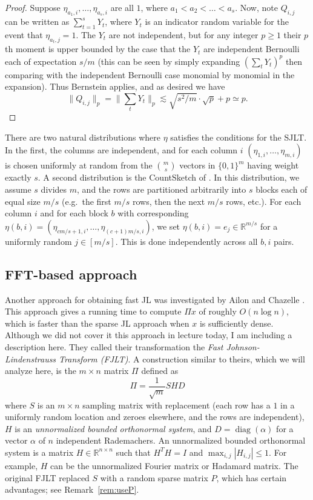 \documentclass[12pt]{article}
\newcommand{\R}{\mathbb{R}}
\newcommand{\EquationName}[1]{\label{eq:#1}}
\newcommand{\Remark}[1]{Remark~\ref{rem:#1}}
\begin{document}
\begin{proof}
Suppose $\eta_{a_1,i}, \ldots, \eta_{a_s, i}$ are all $1$, where $a_1 < a_2 < \ldots < a_s$. Now, note $Q_{i,j}$ can be written as $\sum_{t=1}^s Y_t$, where $Y_t$ is an indicator random variable for the event that $\eta_{a_t, j} = 1$. The $Y_t$ are not independent, but for any integer $p\ge 1$ their $p$th moment is upper bounded by the case that the $Y_t$ are independent Bernoulli each of expectation $s/m$ (this can be seen by simply expanding $(\sum_t Y_t)^p$ then comparing with the independent Bernoulli case monomial by monomial in the expansion). Thus Bernstein applies, and as desired we have
$$
\|Q_{i,j}\|_p = \|\sum_t Y_t\|_p \lesssim \sqrt{s^2/m}\cdot \sqrt{p} + p \simeq p .
$$
\end{proof}

There are two natural distributions where $\eta$ satisfies the conditions for the SJLT. In the first, the columns are independent, and for each column $i$ $(\eta_{1,i},\ldots,\eta_{m,i})$ is chosen uniformly at random from the $\binom{m}{s}$ vectors in $\{0,1\}^m$ having weight exactly $s$. A second distribution is the CountSketch of \cite{CharikarCF04}. In this distribution, we assume $s$ divides $m$, and the rows are partitioned arbitrarily into $s$ blocks each of equal size $m/s$ (e.g.\ the first $m/s$ rows, then the next $m/s$ rows, etc.). For each column $i$ and for each block $b$ with corresponding $\eta(b, i) = (\eta_{cm/s+1, i}, \ldots, \eta_{(c+1)m/s, i})$, we set $\eta(b, i) = e_j\in\R^{m/s}$ for a uniformly random $j\in[m/s]$. This is done independently across all $b, i$ pairs.

\subsection{FFT-based approach}

Another approach for obtaining fast JL was investigated by Ailon and Chazelle \cite{AilonC09}. This approach gives a running time to compute $\Pi x$ of roughly $O(n\log n)$, which is faster than the sparse JL approach when $x$ is sufficiently dense. Although we did not cover it this approach in lecture today, I am including a description here. They called their transformation the {\em Fast Johnson-Lindenstrauss Transform (FJLT)}. A construction similar to theirs, which we will analyze here, is the $m\times n$ matrix $\Pi$ defined as
\begin{equation}
\Pi = \frac 1{\sqrt{m}}SHD \EquationName{fjlt}
\end{equation}
where $S$ is an $m\times n$ sampling matrix with replacement (each row has a $1$ in a uniformly random location and zeroes elsewhere, and the rows are independent), $H$ is an {\em unnormalized bounded orthonormal system}, and $D= \mathop{diag}(\alpha)$ for a vector $\alpha$ of $n$ independent Rademachers. An unnormalized bounded orthonormal system is a matrix $H\in\R^{n\times n}$ such that $H^T H = I$ and $\max_{i,j} |H_{i,j}| \le 1$. For example, $H$ can be the unnormalized Fourier matrix or Hadamard matrix. The original FJLT replaced $S$ with a random sparse matrix $P$, which has certain advantages; see \Remark{useP}.
\end{document}
